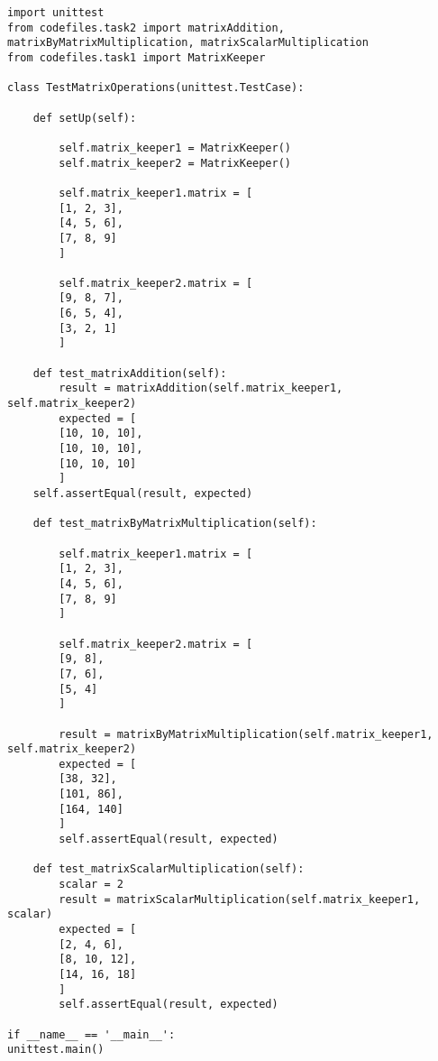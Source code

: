 \begin{lstlisting}
import unittest
from codefiles.task2 import matrixAddition, matrixByMatrixMultiplication, matrixScalarMultiplication
from codefiles.task1 import MatrixKeeper

class TestMatrixOperations(unittest.TestCase):

	def setUp(self):

		self.matrix_keeper1 = MatrixKeeper()
		self.matrix_keeper2 = MatrixKeeper()
		
		self.matrix_keeper1.matrix = [
		[1, 2, 3],
		[4, 5, 6],
		[7, 8, 9]
		]
		
		self.matrix_keeper2.matrix = [
		[9, 8, 7],
		[6, 5, 4],
		[3, 2, 1]
		]
	
	def test_matrixAddition(self):
		result = matrixAddition(self.matrix_keeper1, self.matrix_keeper2)
		expected = [
		[10, 10, 10],
		[10, 10, 10],
		[10, 10, 10]
		]
	self.assertEqual(result, expected)
	
	def test_matrixByMatrixMultiplication(self):
	
		self.matrix_keeper1.matrix = [
		[1, 2, 3],
		[4, 5, 6],
		[7, 8, 9]
		]
		
		self.matrix_keeper2.matrix = [
		[9, 8],
		[7, 6],
		[5, 4]
		]
		
		result = matrixByMatrixMultiplication(self.matrix_keeper1, self.matrix_keeper2)
		expected = [
		[38, 32],
		[101, 86],
		[164, 140]
		]
		self.assertEqual(result, expected)
	
	def test_matrixScalarMultiplication(self):
		scalar = 2
		result = matrixScalarMultiplication(self.matrix_keeper1, scalar)
		expected = [
		[2, 4, 6],
		[8, 10, 12],
		[14, 16, 18]
		]
		self.assertEqual(result, expected)

if __name__ == '__main__':
unittest.main()

\end{lstlisting}

